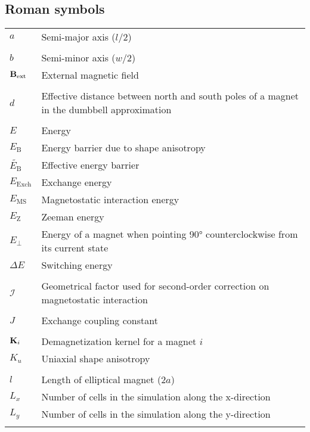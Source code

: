 \subsection*{Roman symbols}
\begin{longtable}[l]{p{60pt} p{350pt}}
	$a$ & Semi-major axis ($l/2$) \\
	&\\

	$b$ & Semi-minor axis ($w/2$) \\
	$\vb{B}_\mathrm{ext}$ & External magnetic field \\
	&\\

	$d$ & Effective distance between north and south poles of a magnet in the dumbbell approximation \\
	&\\

	$E$ & Energy \\
	$E_\mathrm{B}$ & Energy barrier due to shape anisotropy \\ %
	$\widetilde{E_\mathrm{B}}$ & Effective energy barrier \\
	$E_\mathrm{Exch}$ & Exchange energy\\
	$E_\mathrm{MS}$ & Magnetostatic interaction energy \\
	$E_\mathrm{Z}$ & Zeeman energy\\
	$E_\perp$ & Energy of a magnet when pointing \ang{90} counterclockwise from its current state \\
	$\Delta E$ & Switching energy \\
	&\\

	$\mathcal{I}$ & Geometrical factor used for second-order correction on magnetostatic interaction \\
	&\\

	$J$ & Exchange coupling constant \\
	&\\

	$\vb{K}_i$ & Demagnetization kernel for a magnet $i$ \\
	$K_u$ & Uniaxial shape anisotropy \\
	&\\

	$l$ & Length of elliptical magnet ($2a$) \\
	$L_x$ & Number of cells in the simulation along the x-direction \\
	$L_y$ & Number of cells in the simulation along the y-direction \\
	&\\


\end{longtable}
